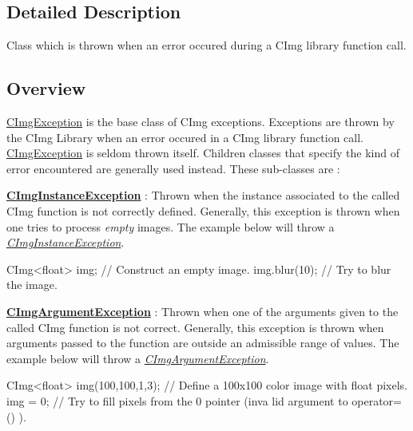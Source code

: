 \subsection{Detailed Description}
Class which is thrown when an error occured during a CImg library function call. \hypertarget{structcimg__library_1_1_c_img_exception_ex1}{}\subsection{Overview}\label{structcimg__library_1_1_c_img_exception_ex1}
\hyperlink{structcimg__library_1_1_c_img_exception}{CImgException} is the base class of CImg exceptions. Exceptions are thrown by the CImg Library when an error occured in a CImg library function call. \hyperlink{structcimg__library_1_1_c_img_exception}{CImgException} is seldom thrown itself. Children classes that specify the kind of error encountered are generally used instead. These sub-\/classes are :


\begin{DoxyItemize}
\item {\bfseries \hyperlink{structcimg__library_1_1_c_img_instance_exception}{CImgInstanceException}} : Thrown when the instance associated to the called CImg function is not correctly defined. Generally, this exception is thrown when one tries to process {\itshape empty\/} images. The example below will throw a {\itshape \hyperlink{structcimg__library_1_1_c_img_instance_exception}{CImgInstanceException}\/}. 
\begin{DoxyCode}
      CImg<float> img;        // Construct an empty image.
      img.blur(10);           // Try to blur the image.
\end{DoxyCode}

\end{DoxyItemize}


\begin{DoxyItemize}
\item {\bfseries \hyperlink{structcimg__library_1_1_c_img_argument_exception}{CImgArgumentException}} : Thrown when one of the arguments given to the called CImg function is not correct. Generally, this exception is thrown when arguments passed to the function are outside an admissible range of values. The example below will throw a {\itshape \hyperlink{structcimg__library_1_1_c_img_argument_exception}{CImgArgumentException}\/}. 
\begin{DoxyCode}
      CImg<float> img(100,100,1,3);   // Define a 100x100 color image with float 
      pixels.
      img = 0;                     // Try to fill pixels from the 0 pointer (inva
      lid argument to operator=() ).
\end{DoxyCode}

\end{DoxyItemize}


